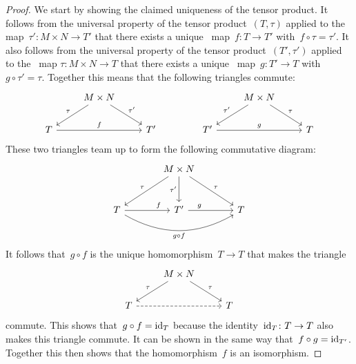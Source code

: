 \begin{proof}
  We start by showing the claimed uniqueness of the tensor product.
  It follows from the universal property of the tensor product~$(T,\tau)$ applied to the~{} map~$\tau' \colon M \times N \to T'$ that there exists a unique~{\klin} map~$f \colon T \to T'$ with~$f \circ \tau = \tau'$.
  It also follows from the universal property of the tensor product~$(T',\tau')$ applied to the~{} map $\tau \colon M \times N \to T$ that there exists a unique~{\klin} map~$g \colon T' \to T$ with~$g \circ \tau' = \tau$.
  Together this means that the following triangles commute:
  \[
    \begin{tikzcd}
        {}
      & M \times N
        \arrow{dl}[above left]{\tau}
        \arrow{dr}[above right]{\tau'}
      & {}
      \\
        T
        \arrow{rr}{f}
      & {}
      & T'
    \end{tikzcd}
    \qquad\qquad
    \begin{tikzcd}
        {}
      & M \times N
        \arrow{dl}[above left]{\tau'}
        \arrow{dr}[above right]{\tau}
      & {}
      \\
        T'
        \arrow{rr}{g}
      & {}
      & T
    \end{tikzcd}
  \]
  These two triangles team up to form the following commutative diagram:
  \[
    \begin{tikzcd}[sep = large]
        {}
      & M \times N
        \arrow{dl}[above left]{\tau}
        \arrow{d}[left]{\tau'}
        \arrow{dr}[above right]{\tau}
      & {}
      \\
        T
        \arrow{r}[above, near end]{f}
        \arrow[bend right]{rr}[below]{g \circ f}
      & T'
        \arrow{r}[above, near start]{g}
      & T
    \end{tikzcd}
  \]
  It follows that~$g \circ f$ is the unique homomorphism~$T \to T$ that makes the triangle
  \[
    \begin{tikzcd}
        {}
      & M \times N
        \arrow{dl}[above left]{\tau}
        \arrow{dr}[above right]{\tau}
      & {}
      \\
        T
        \arrow[dashed]{rr}
      & {}
      & T
    \end{tikzcd}
  \]
  commute.
  This shows that~$g \circ f = \operatorname{id}_T$ because the identity~$\operatorname{id}_T \colon T \to T$ also makes this triangle commute.
  It can be shown in the same way that~$f \circ g = \operatorname{id}_{T'}$.
  Together this then shows that the homomorphism~$f$ is an isomorphism.
  

\end{proof}
